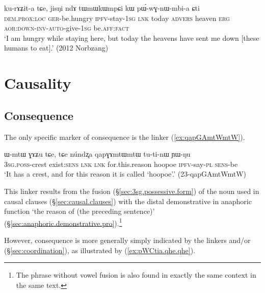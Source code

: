 \begin{exe}
\ex \label{ex:sAmtsMmtsWr.kurAZita}
 ku-rɤʑit-a tɕe, jisŋi ndɤ tɯmɯkɯmpɕi kɯ pɯ́-wɣ-nɯ-mbi-a ɕti  \\
\textsc{dem}.\textsc{prox}:\textsc{loc} \textsc{ger}-be.hungry \textsc{ipfv}-stay-\textsc{1sg} \textsc{lnk} today \textsc{advers} heaven \textsc{erg} \textsc{aor}:\textsc{down}-\textsc{inv}-\textsc{auto}-give-\textsc{1sg} be.\textsc{aff}:\textsc{fact} \\
\glt `I am hungry while staying here, but today the heavens have sent me down [these humans to eat].' (2012 Norbzang)
\end{exe}

 

 \section{Causality} \label{sec:causality}

 \subsection{Consequence} \label{sec:consequence}
 The only specific marker of consequence is the linker  (\ref{ex:qapGAmtWmtW}).

\begin{exe}
\ex \label{ex:qapGAmtWmtW}
\gll ɯ-mtɯ ɣɤʑu tɕe, tɕe núndʐa qapɣɤmtɯmtɯ tu-ti-nɯ ɲɯ-ŋu \\
\textsc{3sg}.\textsc{poss}-crest exist:\textsc{sens} \textsc{lnk} \textsc{lnk} for.this.reason hoopoe \textsc{ipfv}-say-\textsc{pl} \textsc{sens}-be \\
\glt `It has a crest, and for this reason it is called `hoopoe'.' (23-qapGAmtWmtW)
\end{exe}

This linker results from the fusion (§\ref{sec:3sg.possessive.form}) of the noun  used in causal clauses (§\ref{sec:causal.clauses}) with the distal demonstrative  in anaphoric function `the reason of (the preceding sentence)' (§\ref{sec:anaphoric.demonstrative.pro}).\footnote{The phrase  without vowel fusion is also found in exactly the same context in the same text. }

However, consequence is more generally simply indicated by the linkers  and/or  (§\ref{sec:coordination}), as illustrated by (\ref{ex:pWCtia.qhe.qhe}).

